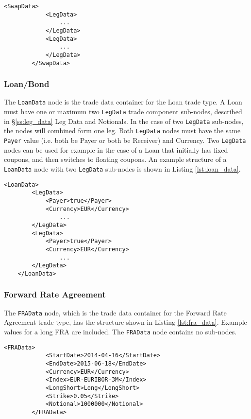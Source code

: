 \begin{lstlisting}[caption=SwapData, label=lst:swap_data]
			 <SwapData>
            <LegData>
            	...
            </LegData>
            <LegData>
            	...
            </LegData>
        </SwapData>
\end{lstlisting}

\subsubsection{Loan/Bond}

The \lstinline!LoanData! node is the trade data container for the Loan trade type. A Loan must have one or maximum two \lstinline!LegData! trade component sub-nodes, described in \S \ref{ss:leg_data} Leg Data and Notionals. In the case of two \lstinline!LegData! sub-nodes, the nodes will combined form one leg.  Both \lstinline!LegData! nodes must have the same \lstinline!Payer! value (i.e. both be Payer or both be Receiver) and Currency. Two \lstinline!LegData!  nodes can be used for example in the case of a Loan that initially has fixed coupons, and then switches to floating coupons. 
An example structure of a  \lstinline!LoanData! node with two \lstinline!LegData! sub-nodes is shown in Listing \ref{lst:loan_data}.

\begin{lstlisting}[caption=LoanData, label=lst:loan_data]
	<LoanData>
		<LegData>
			<Payer>true</Payer>
			<Currency>EUR</Currency>
				...
		</LegData>
		<LegData>
			<Payer>true</Payer>
			<Currency>EUR</Currency>
				...
		</LegData>
	</LoanData>
\end{lstlisting}

\subsubsection{Forward Rate Agreement}

The \lstinline!FRAData! node, which is the trade data container for the Forward Rate Agreement trade type, has the structure shown in Listing \ref{lst:fra_data}.  Example values for a long FRA are included. The \lstinline!FRAData!  node contains no sub-nodes.

\begin{lstlisting}[caption=FRAData, label=lst:fra_data]
        <FRAData>
            <StartDate>2014-04-16</StartDate>
            <EndDate>2015-06-18</EndDate>
            <Currency>EUR</Currency>
            <Index>EUR-EURIBOR-3M</Index>
            <LongShort>Long</LongShort>
            <Strike>0.05</Strike>
            <Notional>1000000</Notional>
        </FRAData>
\end{lstlisting}

